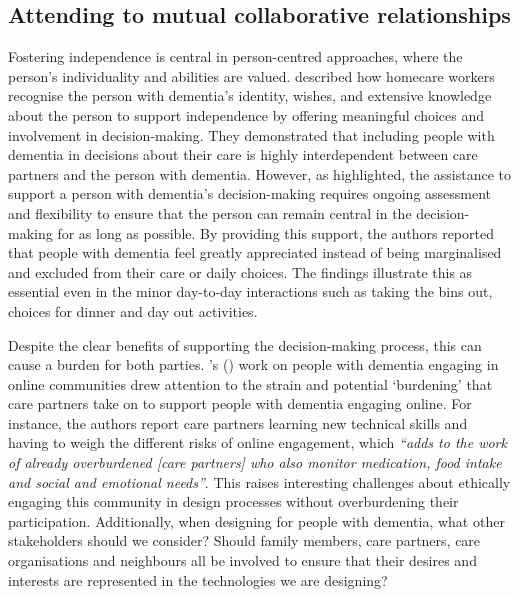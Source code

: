 \subsection{Attending to mutual collaborative relationships}
\label{BL:gap:relationships}
Fostering independence is central in person-centred approaches, where the person's individuality and abilities are valued. \cite{leverton2021supporting} described how homecare workers recognise the person with dementia's identity, wishes, and extensive knowledge about the person to support independence by offering meaningful choices and involvement in decision-making. They demonstrated that including people with dementia in decisions about their care is highly interdependent between care partners and the person with dementia. However, as \cite{fetherstonhaugh2013being} highlighted, the assistance to support a person with dementia's decision-making requires ongoing assessment and flexibility to ensure that the person can remain central in the decision-making for as long as possible. By providing this support, the authors reported that people with dementia feel greatly appreciated instead of being marginalised and excluded from their care or daily choices. The findings illustrate this as essential even in the minor day-to-day interactions such as taking the bins out, choices for dinner and day out activities. 

Despite the clear benefits of supporting the decision-making process, this can cause a burden for both parties. \citeauthor{piper2016technological}'s (\citeyear{piper2016technological}) work on people with dementia engaging in online communities drew attention to the strain and potential `burdening' that care partners take on to support people with dementia engaging online. For instance, the authors report care partners learning new technical skills and having to weigh the different risks of online engagement, which  \textit{``adds to the work of already overburdened [care partners] who also monitor medication, food intake and social and emotional needs''}. This raises interesting challenges about ethically engaging this community in design processes without overburdening their participation. Additionally, when designing for people with dementia, what other stakeholders should we consider? Should family members, care partners, care organisations and neighbours all be involved to ensure that their desires and interests are represented in the technologies we are designing?


